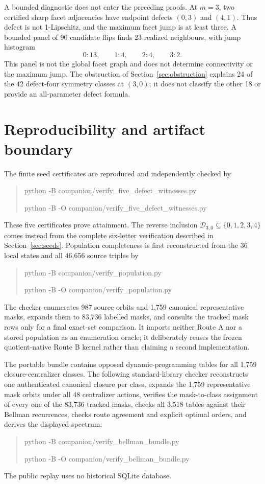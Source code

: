 \documentclass[11pt,a4paper]{article}
\theoremstyle{remark}
\newcommand{\Dspec}{\mathcal D}
\begin{document}
A bounded diagnostic does not enter the preceding proofs.  At \(m=3\), two
certified sharp facet adjacencies have endpoint defects
\((0,3)\) and \((4,1)\).  Thus defect is not 1-Lipschitz, and the maximum
facet jump is at least three.  A bounded panel of 90 candidate flips finds 23
realized neighbours, with jump histogram
\[
0:13,\qquad1:4,\qquad2:4,\qquad3:2.
\]
This panel is not the global facet graph and does not determine connectivity
or the maximum jump.  The obstruction of Section~\ref{sec:obstruction}
explains 24 of the 42 defect-four symmetry classes at \((3,0)\); it does not
classify the other 18 or provide an all-parameter defect formula.

\appendix
\section{Reproducibility and artifact boundary}
\label{app:reproducibility}

The finite seed certificates are reproduced and independently checked by
\begin{quote}\ttfamily\footnotesize\raggedright
python -B companion/verify\_five\_defect\_witnesses.py\par
python -B -O companion/verify\_five\_defect\_witnesses.py
\end{quote}
These five certificates prove attainment.  The reverse inclusion
\(\Dspec_{3,0}\subseteq\{0,1,2,3,4\}\) comes instead from the complete
six-letter verification described in Section~\ref{sec:seeds}.  Population
completeness is first reconstructed from the 36 local states and all 46,656
source triples by
\begin{quote}\ttfamily\footnotesize\raggedright
python -B companion/verify\_population.py\par
python -B -O companion/verify\_population.py
\end{quote}
The checker enumerates 987 source orbits and 1,759 canonical representative
masks, expands them to 83,736 labelled masks, and consults the tracked mask
rows only for a final exact-set comparison.  It imports neither Route A nor a
stored population as an enumeration oracle; it deliberately reuses the frozen
quotient-native Route B kernel rather than claiming a second implementation.

The portable
bundle contains opposed dynamic-programming tables for all 1,759
closure-centralizer classes.  The following standard-library checker
reconstructs one authenticated canonical closure per class, expands the 1,759
representative mask orbits under all 48 centralizer actions, verifies the
mask-to-class assignment of every one of the 83,736 tracked masks, checks all
3,518 tables against their Bellman recurrences, checks route agreement and
explicit optimal orders, and derives the displayed spectrum:
\begin{quote}\ttfamily\footnotesize\raggedright
python -B companion/verify\_bellman\_bundle.py\par
python -B -O companion/verify\_bellman\_bundle.py
\end{quote}
The public replay uses no historical SQLite database.
\end{document}
